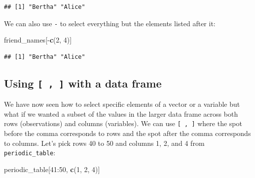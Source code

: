 \documentclass[]{tufte-book}
\newenvironment{Shaded}{\begin{snugshade}}{\end{snugshade}}
\newcommand{\KeywordTok}[1]{\textcolor[rgb]{0.13,0.29,0.53}{\textbf{{#1}}}}
\newcommand{\DecValTok}[1]{\textcolor[rgb]{0.00,0.00,0.81}{{#1}}}
\newcommand{\NormalTok}[1]{{#1}}
\begin{document}
\begin{verbatim}
## [1] "Bertha" "Alice"
\end{verbatim}

We can also use \texttt{-} to select everything but the elements listed
after it:

\begin{Shaded}
\begin{Highlighting}[]
\NormalTok{friend_names[-}\KeywordTok{c}\NormalTok{(}\DecValTok{2}\NormalTok{, }\DecValTok{4}\NormalTok{)]}
\end{Highlighting}
\end{Shaded}

\begin{verbatim}
## [1] "Bertha" "Alice"
\end{verbatim}

\subsection{\texorpdfstring{Using \texttt{{[}\ ,\ {]}} with a data
frame}{Using {[} , {]} with a data frame}}\label{using-with-a-data-frame}

We have now seen how to select specific elements of a vector or a
variable but what if we wanted a subset of the values in the larger data
frame across both rows (observations) and columns (variables). We can
use \texttt{{[}\ ,\ {]}} where the spot before the comma corresponds to
rows and the spot after the comma corresponds to columns. Let's pick
rows 40 to 50 and columns 1, 2, and 4 from \texttt{periodic\_table}:

\begin{Shaded}
\begin{Highlighting}[]
\NormalTok{periodic_table[}\DecValTok{41}\NormalTok{:}\DecValTok{50}\NormalTok{, }\KeywordTok{c}\NormalTok{(}\DecValTok{1}\NormalTok{, }\DecValTok{2}\NormalTok{, }\DecValTok{4}\NormalTok{)]}
\end{Highlighting}
\end{Shaded}
\end{document}
